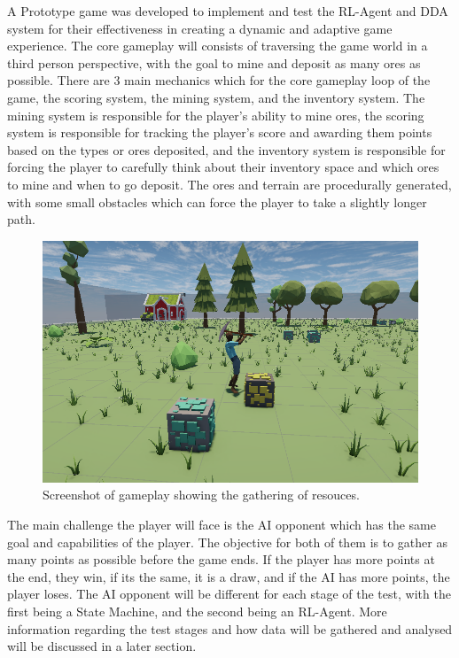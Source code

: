\begin{spacing}{2.0}

	A Prototype game was developed to implement and test the RL-Agent and DDA system for their effectiveness in creating a dynamic and adaptive game experience.
	The core gameplay will consists of traversing the game world in a third person perspective, with the goal to mine and deposit as many ores as possible.
	There are 3 main mechanics which for the core gameplay loop of the game, the scoring system, the mining system, and the inventory system. The mining system is responsible for the player's ability to mine ores,
	the scoring system is responsible for tracking the player's score and awarding them points based on the types or ores deposited, and the inventory system is responsible for forcing the player to carefully
	think about their inventory space and which ores to mine and when to go deposit. The ores and terrain are procedurally generated, with some small obstacles which can force the player to take a slightly longer path.

	\begin{figure}[ht]
		\centering
		\includegraphics[width=5in, fbox]{Figures/Gameplay.png}
		\caption{Screenshot of gameplay showing the gathering of resouces.}
		\label{fig:gameplay}
	\end{figure}

	The main challenge the player will face is the AI opponent which has the same goal and capabilities of the player. The objective for both of them is to gather as many points as possible before the game ends.
	If the player has more points at the end, they win, if its the same, it is a draw, and if the AI has more points, the player loses. The AI opponent will be different for each stage of the test, with the first
	being a State Machine, and the second being an RL-Agent. More information regarding the test stages and how data will be gathered and analysed will be discussed in a later section.


\end{spacing}
